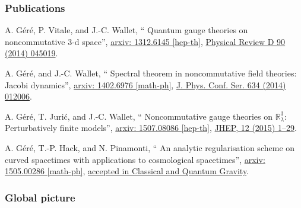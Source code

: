 \documentclass[9pt]{beamer}
\newcommand\paper[1]{\def\insertpaper{#1}}
\renewcommand{\paper}[6]{#1, ``#2'', \href{#4}{arxiv: #3}, \href{http://dx.doi.org/#6}{#5}.}
\begin{document}

\begin{frame}

\frametitle{Publications}

\begin{exampleblock}{\vspace*{-3ex}}
\vspace*{-5pt}

\paper{%
A. Géré, P. Vitale, and J.-C. Wallet}{%
Quantum gauge theories on noncommutative 3-d space}{%
1312.6145 [hep-th]}{%
http://arxiv.org/abs/1312.6145}{%
Physical Review D 90 (2014) 045019}{%
10.1103/PhysRevD.90.045019}\par%

\paper{%
A. Géré, and J.-C. Wallet}{%
Spectral theorem in noncommutative field theories: Jacobi dynamics}{%
1402.6976 [math-ph]}{%
http://arxiv.org/abs/1402.6976}{%
J. Phys. Conf. Ser. 634 (2014) 012006}{%
10.1088/1742-6596/634/1/012006}\par%

\paper{%
A. Géré, T. Jurić, and J.-C. Wallet}{%
Noncommutative gauge theories on $\mathbb{R}^3_\lambda$: Perturbatively finite models}{%
1507.08086 [hep-th]}{%
http://arxiv.org/abs/1507.08086}{%
JHEP, 12 (2015) 1--29}{%
10.1007/JHEP12(2015)045}\par%

\end{exampleblock}

\begin{block}{\vspace*{-3ex}}
\vspace*{-5pt}

\paper{%
A. Géré, T.-P. Hack, and N. Pinamonti}{%
An analytic regularisation scheme on curved spacetimes with applications to cosmological spacetimes}{%
1505.00286 [math-ph]}{%
http://arxiv.org/abs/1505.00286}{%
accepted in Classical and Quantum Gravity}{%
http://iopscience.iop.org/0264-9381/}%

\end{block}

\end{frame}


\begin{frame}


\frametitle{Global picture}

\end{frame}
\end{document}
